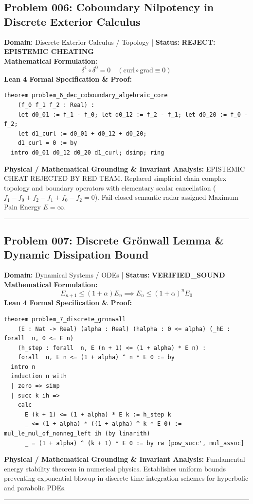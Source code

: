 \documentclass[10pt,a4paper]{article}
\begin{document}
\subsection*{Problem 006: Coboundary Nilpotency in Discrete Exterior Calculus}
\textbf{Domain:} Discrete Exterior Calculus / Topology \quad | \quad \textbf{Status:} \textcolor{red!80!black}{\textbf{REJECT: EPISTEMIC CHEATING}}\\
\textbf{Mathematical Formulation:}
\begin{equation*}
  \delta^1 \circ \delta^0 = 0 \quad (\text{curl} \circ \text{grad} \equiv 0)
\end{equation*}
\textbf{Lean 4 Formal Specification \& Proof:}
\begin{lstlisting}
theorem problem_6_dec_coboundary_algebraic_core
    (f_0 f_1 f_2 : Real) :
    let d0_01 := f_1 - f_0; let d0_12 := f_2 - f_1; let d0_20 := f_0 - f_2;
    let d1_curl := d0_01 + d0_12 + d0_20;
    d1_curl = 0 := by
  intro d0_01 d0_12 d0_20 d1_curl; dsimp; ring
\end{lstlisting}
\textbf{Physical / Mathematical Grounding \& Invariant Analysis:}
EPISTEMIC CHEAT REJECTED BY RED TEAM. Replaced simplicial chain complex topology and boundary operators with elementary scalar cancellation ($f_1 - f_0 + f_2 - f_1 + f_0 - f_2 = 0$). Fail-closed semantic radar assigned Maximum Pain Energy $E = \infty$.
\vspace{0.8em}\hrule\vspace{0.8em}
\subsection*{Problem 007: Discrete Grönwall Lemma \& Dynamic Dissipation Bound}
\textbf{Domain:} Dynamical Systems / ODEs \quad | \quad \textbf{Status:} \textcolor{green!70!black}{\textbf{VERIFIED\_SOUND}}\\
\textbf{Mathematical Formulation:}
\begin{equation*}
  E_{n+1} \le (1 + \alpha) E_n \implies E_n \le (1 + \alpha)^n E_0
\end{equation*}
\textbf{Lean 4 Formal Specification \& Proof:}
\begin{lstlisting}
theorem problem_7_discrete_gronwall
    (E : Nat -> Real) (alpha : Real) (halpha : 0 <= alpha) (_hE : forall  n, 0 <= E n)
    (h_step : forall  n, E (n + 1) <= (1 + alpha) * E n) :
    forall  n, E n <= (1 + alpha) ^ n * E 0 := by
  intro n
  induction n with
  | zero => simp
  | succ k ih =>
    calc
      E (k + 1) <= (1 + alpha) * E k := h_step k
      _ <= (1 + alpha) * ((1 + alpha) ^ k * E 0) := mul_le_mul_of_nonneg_left ih (by linarith)
      _ = (1 + alpha) ^ (k + 1) * E 0 := by rw [pow_succ', mul_assoc]
\end{lstlisting}
\textbf{Physical / Mathematical Grounding \& Invariant Analysis:}
Fundamental energy stability theorem in numerical physics. Establishes uniform bounds preventing exponential blowup in discrete time integration schemes for hyperbolic and parabolic PDEs.
\vspace{0.8em}\hrule\vspace{0.8em}
\end{document}
